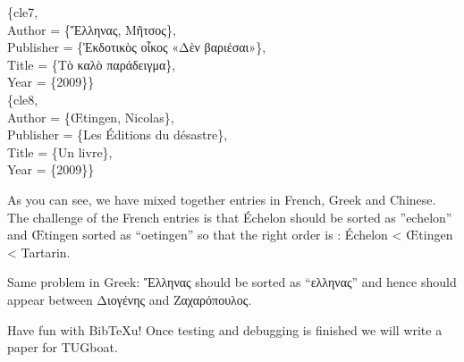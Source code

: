 ﻿\documentclass{article}
\begin{document}
\noindent@book\{cle7,\\
	Author = \{Ἕλληνας, Μῆτσος\},\\
	Publisher = \{Ἐκδοτικὸς οἶκος «Δὲν βαριέσαι»\},\\
	Title = \{Τὸ καλὸ παράδειγμα\},\\
	Year = \{2009\}\}\\

\noindent@book\{cle8,\\
	Author = \{Œtingen, Nicolas\},\\
	Publisher = \{Les Éditions du désastre\},\\
	Title = \{Un livre\},\\
	Year = \{2009\}\}\\

\medskip

As you can see, we have mixed together entries in French, Greek and Chinese. The challenge of the French entries is that Échelon should be sorted as ”echelon” and Œtingen sorted as “oetingen” so that the right order is : Échelon < Œtingen < Tartarin.

Same problem in Greek: Ἕλληνας should be sorted as “ελληνας” and hence should appear between Διογένης and Ζαχαρόπουλος.

Have fun with Bib\TeX u! Once testing and debugging is finished we will write a paper for TUGboat.

\nocite{*}


\end{document}
